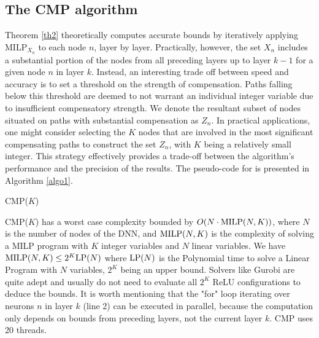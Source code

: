 \subsection{The CMP algorithm}


Theorem \ref{th2} theoretically computes accurate bounds by iteratively applying MILP$_{X_n}$ to each node $n$, layer by layer. Practically, however, the set $X_n$ includes a substantial portion of the nodes from all preceding layers up to layer $k-1$ for a given node $n$ in layer $k$. Instead, an interesting trade off between speed and accuracy is to set a threshold on the strength of compensation. Paths falling below this threshold are deemed to not warrant an individual integer variable due to insufficient compensatory strength. We denote the resultant subset of nodes situated on paths with substantial compensation as $Z_n$. In practical applications, one might consider selecting the $K$ nodes that are involved in the most significant compensating paths to construct the set $Z_n$, with $K$ being a relatively small integer. This strategy effectively provides a trade-off between the algorithm's performance and the precision of the results. The pseudo-code for \CMP is presented in Algorithm \ref{algo1}.






\begin{algorithm}[b!]
	\caption{CMP($K$)}
	\label{algo1}
	
	
\end{algorithm}	




CMP($K$) has a worst case complexity bounded by $O(N \cdot {\textrm{MILP}}(N,K))$, 
where $N$ is the number of nodes of the DNN, 
and ${\textrm{MILP}}(N,K)$ is the complexity of solving a MILP program with $K$ integer variables and $N$ linear variables.
We have ${\textrm{MILP}}(N,K) \leq 2^K {\textrm{LP}}(N)$ where ${\textrm{LP}}(N)$ is the Polynomial time to solve a Linear Program with $N$ variables, $2^K$ being an upper bound. Solvers like Gurobi are quite adept and usually do not need to evaluate all $2^K$ ReLU configurations to deduce the bounds.
It is worth mentioning that the "for" loop iterating over neurons $n$ in layer $k$ (line 2) can be executed in parallel, because the computation only depends on bounds from preceding layers, not the current layer $k$. 
CMP uses 20 threads.


